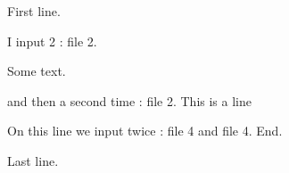 First line.


I input 2 : file 2.

Some text.

and then a second time : file 2.
This is a line

On this line we input twice : file 4 and file 4. End.  %

Last line.
